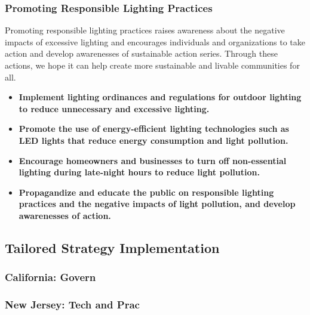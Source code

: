 \subsubsection{Promoting Responsible Lighting Practices}
Promoting responsible lighting practices raises awareness about the negative impacts of excessive lighting and encourages individuals and organizations to take action and develop awarenesses of sustainable action series. Through these actions, we hope it can help create more sustainable and livable communities for all.
\begin{itemize}
    \item \textbf{Implement lighting ordinances and regulations for outdoor lighting to reduce unnecessary and excessive lighting.}
    
    \item \textbf{Promote the use of energy-efficient lighting technologies such as LED lights that reduce energy consumption and light pollution.}
    
    \item \textbf{Encourage homeowners and businesses to turn off non-essential lighting during late-night hours to reduce light pollution.}
    
    \item \textbf{Propagandize and educate the public on responsible lighting practices and the negative impacts of light pollution, and develop awarenesses of action.}
\end{itemize}



\subsection{Tailored Strategy Implementation}

\subsubsection{California: Govern}

\subsubsection{New Jersey: Tech and Prac}


